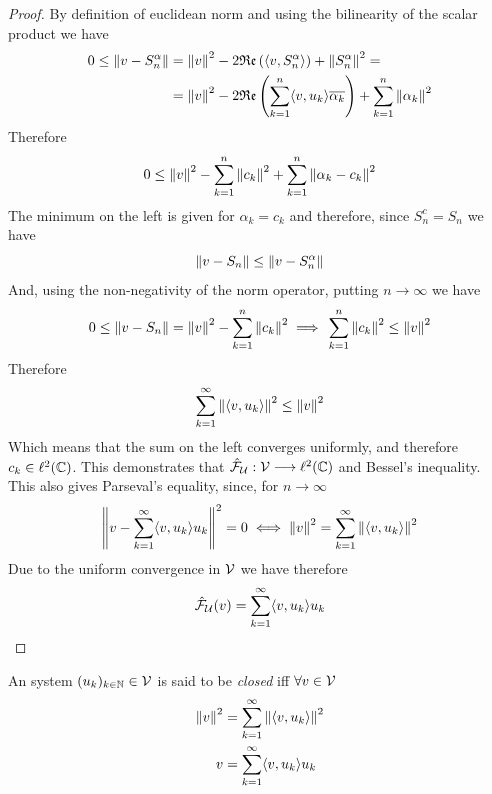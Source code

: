 \documentclass[../complete.tex]{subfiles}
\begin{document}
\begin{proof}
	By definition of euclidean norm and using the bilinearity of the scalar product we have
	\begin{equation*}
		\begin{aligned}
			0\le\norm{v-S_n^\alpha}&=\norm{v}^2-2\mathfrak{Re}\left( \langle v, S_n^\alpha \rangle \right)+\norm{S_n^\alpha}^2=\\
			&=\norm{v}^2-2\mathfrak{Re}\left( \sum_{k=1}^n\langle v, u_k \rangle\overline{\alpha_k} \right)+\sum_{k=1}^{n}\norm{\alpha_k}^2\\
		\end{aligned}
	\end{equation*}
	Therefore
	\begin{equation*}
		0\le\norm{v}^2-\sum_{k=1}^{n}\norm{c_k}^2+\sum_{k=1}^n\norm{\alpha_k-c_k}^2
	\end{equation*}
	The minimum on the left is given for $\alpha_k=c_k$ and therefore, since $S_n^c=S_n$ we have
	\begin{equation*}
		\norm{v-S_n}\le\norm{v-S_n^\alpha}
	\end{equation*}
	And, using the non-negativity of the norm operator, putting $n\to\infty$ we have
	\begin{equation*}
		0\le\norm{v-S_n}=\norm{v}^2-\sum_{k=1}^n\norm{c_k}^2\implies{}\sum_{k=1}^{n}\norm{c_k}^2\le\norm{v}^2
	\end{equation*}
	Therefore
	\begin{equation*}
		\sum_{k=1}^{\infty}\norm{\langle v, u_k \rangle}^2\le\norm{v}^2
	\end{equation*}
	Which means that the sum on the left converges uniformly, and therefore $c_k\in\ell^2(\mathbb{C})$. This demonstrates that $\hat{\mathcal{F}}_{\operatorname{\mathcal{U}}}:\mathcal{V}\overset{}{\longrightarrow}\ell^2(\mathbb{C})$ and Bessel's inequality.\\
	This also gives Parseval's equality, since, for $n\to\infty$
	\begin{equation*}
		\norm{v-\sum_{k=1}^{\infty}\langle v, u_k \rangle u_k}^2=0\iff{}\norm{v}^2=\sum_{k=1}^{\infty}\norm{\langle v, u_k \rangle}^2
	\end{equation*}
	Due to the uniform convergence in $\mathcal{V}$ we have therefore
	\begin{equation*}
		\hat{\mathcal{F}}_{\operatorname{\mathcal{U}}}(v)=\sum_{k=1}^\infty\langle v, u_k \rangle u_k
	\end{equation*}
\end{proof}
\begin{dfn}
	An system $(u_k)_{k\in\mathbb{N}}\in\mathcal{V}$ is said to be \textit{closed} iff $\forall v\in\mathcal{V}$
	\begin{equation*}
		\begin{aligned}
			\norm{v}^2&=\sum_{k=1}^{\infty}\norm{\langle v, u_k \rangle}^2\\
			v&=\sum_{k=1}^{\infty}\langle v, u_k \rangle u_k
		\end{aligned}
	\end{equation*}
\end{dfn}
\end{document}
